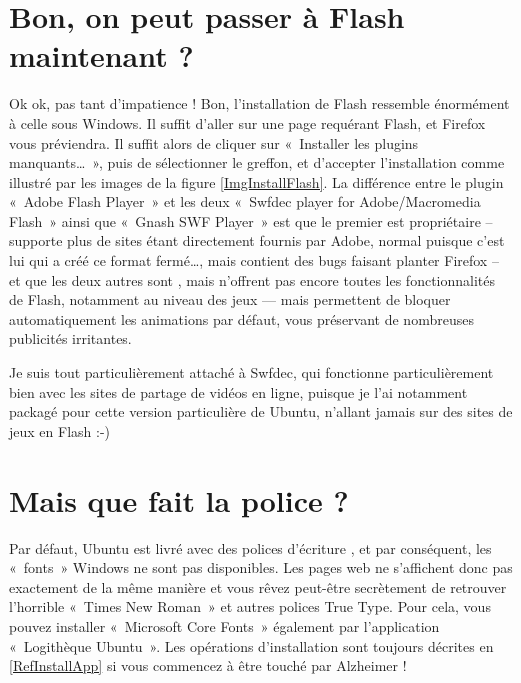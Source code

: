 \section{Bon, on peut passer à Flash maintenant ?}
Ok ok, pas tant d'impatience ! Bon, l'installation de Flash ressemble énormément à celle sous Windows. Il suffit d'aller sur une page requérant Flash, et Firefox vous préviendra. Il suffit alors de cliquer sur «~Installer les plugins manquants\ldots{}~», puis de sélectionner le greffon, et d'accepter l'installation comme illustré par les images de la figure \ref{ImgInstallFlash}. La différence entre le plugin «~Adobe Flash Player~» et les deux «~Swfdec player for Adobe/Macromedia Flash~» ainsi que «~Gnash SWF Player~» est que le premier est propriétaire -- supporte plus de sites étant directement fournis par Adobe, normal puisque c'est lui qui a créé ce format fermé\ldots{}, mais contient des bugs faisant planter Firefox -- et que les deux autres sont , mais n'offrent pas encore toutes les fonctionnalités de Flash, notamment au niveau des jeux --- mais permettent de bloquer automatiquement les animations par défaut, vous préservant de nombreuses publicités irritantes.\par
\InstallationFlash
\begin{nota}
Je suis tout particulièrement attaché à Swfdec, qui fonctionne particulièrement bien avec les sites de partage de vidéos en ligne, puisque je l'ai notamment packagé pour cette version particulière de Ubuntu, n'allant jamais sur des sites de jeux en Flash :-)
\end{nota}
\section{Mais que fait la police ?}
Par défaut, Ubuntu est livré avec des polices d'écriture , et par conséquent, les «~fonts~» Windows ne sont pas disponibles. Les pages web ne s'affichent donc pas exactement de la même manière et vous rêvez peut-être secrètement de retrouver l'horrible «~Times New Roman~» et autres polices True Type. Pour cela, vous pouvez installer «~Microsoft Core Fonts~» également par l'application «~Logithèque Ubuntu~». Les opérations d'installation sont toujours décrites en \ref{RefInstallApp} si vous commencez à être touché par Alzheimer !
